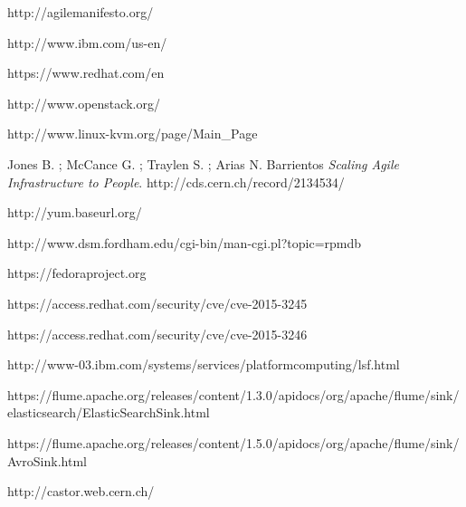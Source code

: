 
\begin{thebibliography}{90}
\rhead[\fancyplain{}{\bfseries \leftmark}]{\fancyplain{}{\bfseries
\thepage}}

http://agilemanifesto.org/

http://www.ibm.com/us-en/

https://www.redhat.com/en

http://www.openstack.org/

http://www.linux-kvm.org/page/Main\_Page

Jones B. ; McCance G. ; Traylen S. ; Arias N. Barrientos 
\textit{Scaling Agile Infrastructure to People}.
http://cds.cern.ch/record/2134534/

http://yum.baseurl.org/

http://www.dsm.fordham.edu/cgi-bin/man-cgi.pl?topic=rpmdb

https://fedoraproject.org

https://access.redhat.com/security/cve/cve-2015-3245

https://access.redhat.com/security/cve/cve-2015-3246

http://www-03.ibm.com/systems/services/platformcomputing/lsf.html

https://flume.apache.org/releases/content/1.3.0/apidocs/org/apache/flume/sink/elasticsearch/ElasticSearchSink.html

https://flume.apache.org/releases/content/1.5.0/apidocs/org/apache/flume/sink/AvroSink.html

http://castor.web.cern.ch/



\end{thebibliography}
